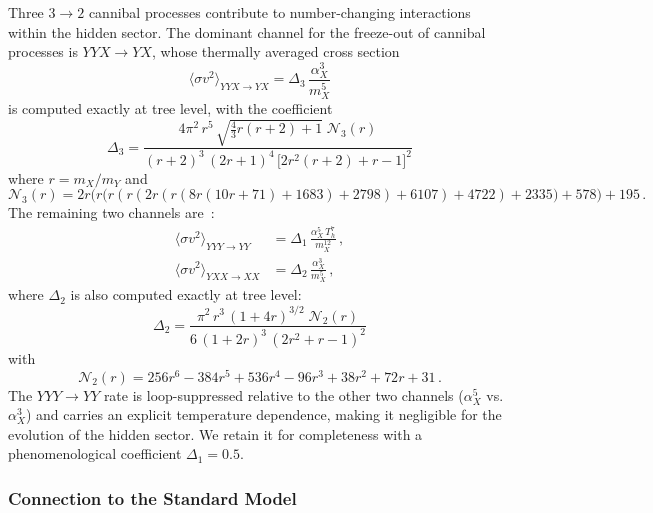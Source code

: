 \documentclass[11pt]{article}
\numberwithin{equation}{section}
\newcommand{\sigmavv}{\langle\sigma v^2\rangle}
\newcommand{\TD}{T_h}
\newcommand{\mX}{m_X}
\newcommand{\mY}{m_Y}
\newcommand{\alphaX}{\alpha_X}
\begin{document}
Three $3\to2$ cannibal processes contribute to number-changing interactions within the hidden sector. The dominant channel for the freeze-out of cannibal processes is $YYX\to YX$, whose thermally averaged cross section
\begin{equation}
    \sigmavv_{YYX\to YX} = \Delta_3\,\frac{\alphaX^3}{\mX^5}
    \label{eq:sv2_YYX}
\end{equation}
is computed exactly at tree level, with the coefficient
\begin{equation}
    \Delta_3 = \frac{4\pi^2\,r^5\,\sqrt{\tfrac{4}{3}r(r+2)+1}\;\mathcal{N}_3(r)}{(r+2)^3\,(2r+1)^4\,\big[2r^2(r+2) + r - 1\big]^2}
    \label{eq:Delta3}
\end{equation}
where $r = \mX/\mY$ and
\begin{equation}
    \mathcal{N}_3(r) = 2r\Big(r\big(r(r(2r(r(8r(10r+71)+1683)+2798)+6107)+4722)+2335\big)+578\Big)+195\,.
\end{equation}
The remaining two channels are~\cite{Berlin:2016gtr}:
\begin{align}
    \sigmavv_{YYY\to YY} &= \Delta_1\,\frac{\alphaX^5\,\TD^7}{\mX^{12}}\,, \label{eq:sv2_YYY} \\
    \sigmavv_{YXX\to XX} &= \Delta_2\,\frac{\alphaX^3}{\mX^5}\,, \label{eq:sv2_YXX}
\end{align}
where $\Delta_2$ is also computed exactly at tree level:
\begin{equation}
    \Delta_2 = \frac{\pi^2\,r^3\,(1+4r)^{3/2}\;\mathcal{N}_2(r)}{6\,(1+2r)^3\,(2r^2 + r - 1)^2}
    \label{eq:Delta2}
\end{equation}
with
\begin{equation}
    \mathcal{N}_2(r) = 256r^6 - 384r^5 + 536r^4 - 96r^3 + 38r^2 + 72r + 31\,.
\end{equation}
The $YYY\to YY$ rate is loop-suppressed relative to the other two channels ($\alphaX^5$ vs.\ $\alphaX^3$) and carries an explicit temperature dependence, making it negligible for the evolution of the hidden sector. We retain it for completeness with a phenomenological coefficient $\Delta_1 = 0.5$.

\subsubsection{Connection to the Standard Model}
\label{sec:VP_SM}
\end{document}

